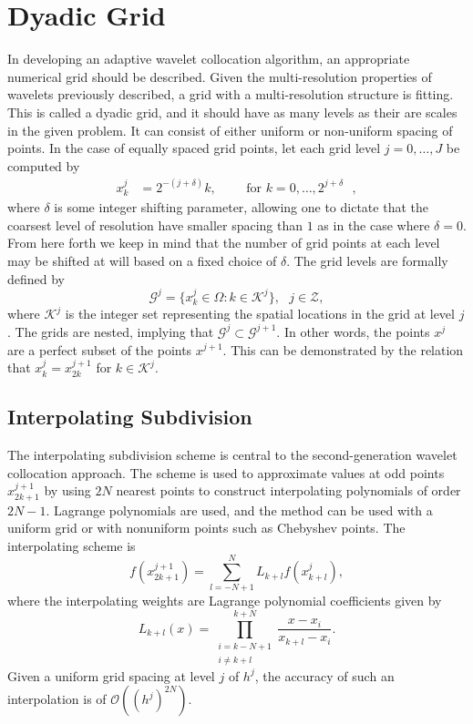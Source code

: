\documentclass[11pt]{article}
\begin{document}
\section{Dyadic Grid}
In developing an adaptive wavelet collocation algorithm, an appropriate numerical grid should be described. Given the 
multi-resolution properties of wavelets previously described, a grid with a multi-resolution structure is fitting. This 
is called a dyadic grid, and it should have as many levels as their are scales in the given problem. It can consist of 
either uniform or non-uniform spacing of points. In the case of equally spaced grid points, 
let each grid level $j = 0, \dots, J$ be computed by 
\begin{align}
x^{j}_{k} &= 2^{-(j+\delta)} k,\text{ } \text{ } \text{ }  \text{ for $k=0,\dots,2^{j+\delta}$ },
\end{align}
where $\delta$ is some integer shifting parameter, allowing one to dictate that the coarsest level of resolution have 
smaller spacing than $1$ as in the case where $\delta=0$. From here forth we keep in mind that the 
number of grid points at each level may be shifted at will based on a fixed choice of $\delta$. 
The grid levels are formally defined by 
\begin{equation}
    \mathcal{G}^j= \{ x_{k}^{j} \in \Omega : k \in \mathcal{K}^j \}, \text{ } j \in \mathcal{Z},
\end{equation}
where $\mathcal{K}^{j}$ is the integer set representing the spatial locations in the grid at level $j$. The grids are 
nested, implying that $\mathcal{G}^{j} \subset \mathcal{G}^{j+1}$. In other words, the points $x^{j}$ are a perfect 
subset of the points $x^{j+1}$. This can be demonstrated by the relation that 
$x_{k}^{j}=x_{2k}^{j+1}$ for $k \in \mathcal{K}^{j}$.

\subsection{Interpolating Subdivision}
The interpolating subdivision scheme is central to the second-generation wavelet collocation approach. The scheme is used to
approximate values at odd points $x_{2k+1}^{j+1}$ by using $2N$ nearest points to construct interpolating polynomials of 
order $2N-1$. Lagrange polynomials are used, and the method can be used with a uniform grid or with 
nonuniform points such as Chebyshev points. The interpolating scheme is 
\begin{equation}
    f(x_{2k+1}^{j+1})=\sum_{l=-N+1}^{N} L_{k+l} f(x_{k+l}^{j}), \label{interp}
\end{equation}
where the interpolating weights are Lagrange polynomial coefficients given by 
\begin{equation}
    L_{k+l}(x)=\prod_{ \substack{ i=k-N+1 \\ i\neq k+l } }^{k+N} \frac{x-x_i}{x_{k+l}-x_i}.
\end{equation}
Given a uniform grid spacing at level $j$ of $h^j$, the accuracy of such an interpolation is of $\mathcal{O}((h^{j})^{2N})$.  
\end{document}
